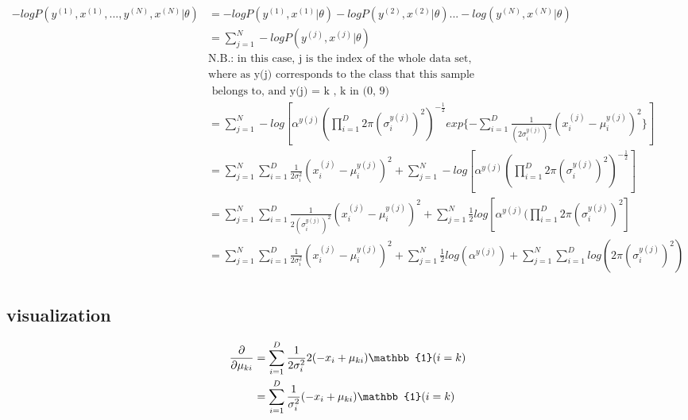 \documentclass[letterpaper, 12]{article}
\begin{document}
\begin{equation*}
\begin{split}
-log P(y^{(1)}, x^{(1)}, ..., y^{(N)}, x^{(N)} | \theta) 
&=-log P(y^{(1)}, x^{(1)} | \theta) -log P(y^{(2)}, x^{(2)} | \theta) ... - log( y^{(N)}, x^{(N)} | \theta)\\
&= \sum_{j=1}^{N} -log P(y^{(j)}, x^{(j)} | \theta)\\
&\text{N.B.: in this case, j is the index of the whole data set,} \\
&\text{where as y(j) corresponds to the class that this sample}\\
&\text{ belongs to, and y(j) = k , k in (0, 9)}\\
&= \sum_{j = 1}^{N} -log [\alpha^{y(j)} (\prod_{i = 1}^{D} 2 \pi (\sigma_{i} ^{y(j)}) ^2)^{ -\frac{1}{2}}
	 exp\{ - \sum_{i = 1}^{D} \frac{1}{(2 \sigma_{i}^{y(j)}) ^2} (x_{i}^{(j)} - \mu_{i}^{y(j)})^2  \}] \\
&= \sum_{j=1}^{N} \sum_{i = 1}^{D} \frac{1}{2 \sigma_{i} ^2}(x_{i}^{(j)} - \mu_{i}^{y(j)})^2 
	+ \sum_{j = 1}^{N} -log [\alpha^{y(j)} (\prod_{i = 1}^{D} 2 \pi (\sigma_{i}^{y(j)}) ^2)^{ -\frac{1}{2}}]\\
&=  \sum_{j = 1}^{N} \sum_{i = 1}^{D} \frac{1}{2(\sigma_{i}^{y(j)})^2}(x_{i}^{(j)} - \mu_{i}^{y(j)})^2 
	+ \sum_{j = 1}^{N} \frac{1}{2} log [\alpha^{y(j)} (\prod_{i = 1}^{D} 2 \pi (\sigma_{i}^{y(j)}) ^2]\\
&= \sum_{j = 1}^{N} \sum_{i = 1}^{D} \frac{1}{2 \sigma_{i} ^2}(x_{i}^{(j)} - \mu_{i}^{y(j)})^2  + 
	\sum_{j=1}^{N} \frac{1}{2} log( \alpha^{y(j)}) + \sum_{j = 1}^{N} \sum_{i = 1}^{D} log(2 \pi (\sigma_{i}^{y(j)})^2)  \\
\end{split}
\end{equation*}
\subsection{visualization}

\begin{equation*}
\begin{split}
\pdv{}{\mu_{ki}} &=  \sum_{i = 1}^{D} \frac{1}{2 \sigma_{i} ^2}
		2(- x_{i} + \mu_{ki})  \mathbb{1} ( i = k) \\
&= \sum_{i = 1}^{D} \frac{1}{\sigma_{i} ^2}
		(- x_{i} + \mu_{ki})  \mathbb{1} ( i = k) \\
\end{split}
\end{equation*}

\end{document}
